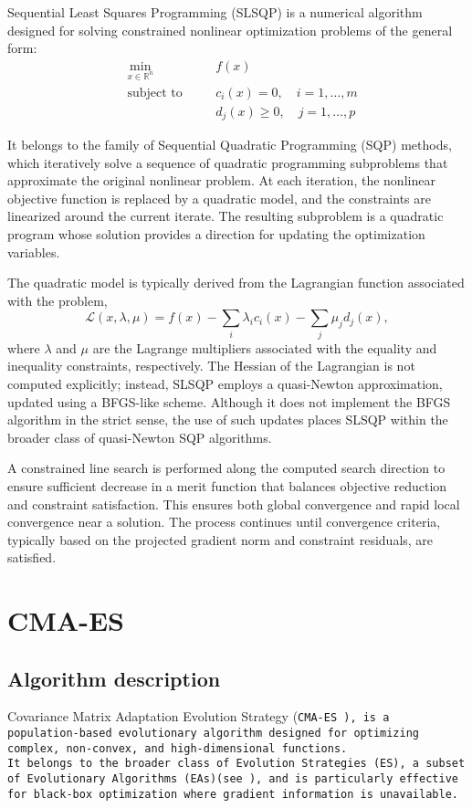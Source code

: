 Sequential Least Squares Programming (SLSQP) is a numerical algorithm designed for solving constrained nonlinear optimization problems of the general form:
\begin{align*}
& \min_{x \in \mathbb{R}^n} \quad && f(x) \\
& \text{subject to} \quad && c_i(x) = 0, \quad i = 1, \dots, m \\
& && d_j(x) \geq 0, \quad j = 1, \dots, p
\end{align*}

It belongs to the family of Sequential Quadratic Programming (SQP) methods, which iteratively solve a sequence of quadratic programming subproblems that approximate the original nonlinear problem. 
At each iteration, the nonlinear objective function is replaced by a quadratic model, and the constraints are linearized around the current iterate. 
The resulting subproblem is a quadratic program whose solution provides a direction for updating the optimization variables.

The quadratic model is typically derived from the Lagrangian function associated with the problem,
\begin{equation}
\mathcal{L}(x, \lambda, \mu) = f(x) - \sum_{i} \lambda_i c_i(x) - \sum_{j} \mu_j d_j(x),
\end{equation}
where $ \lambda $ and $ \mu $ are the Lagrange multipliers associated with the equality and inequality constraints, respectively. 
The Hessian of the Lagrangian is not computed explicitly; instead, SLSQP employs a quasi-Newton approximation, updated using a BFGS-like scheme. 
Although it does not implement the BFGS algorithm in the strict sense, the use of such updates places SLSQP within the broader class of quasi-Newton SQP algorithms.

A constrained line search is performed along the computed search direction to ensure sufficient decrease in a merit function that balances objective reduction and constraint satisfaction. 
This ensures both global convergence and rapid local convergence near a solution. 
The process continues until convergence criteria, typically based on the projected gradient norm and constraint residuals, are satisfied.



\section{CMA-ES}

\subsection{Algorithm description}
Covariance Matrix Adaptation Evolution Strategy (\tt{CMA-ES} \cite{cmaessimplepractical}), is a population-based evolutionary algorithm designed for optimizing complex, non-convex, and high-dimensional functions.\\
It belongs to the broader class of Evolution Strategies (ES), a subset of Evolutionary Algorithms (EAs)(see \cite{sloss20192019evolutionaryalgorithmsreview}), and is particularly effective for black-box optimization where gradient information is unavailable.

